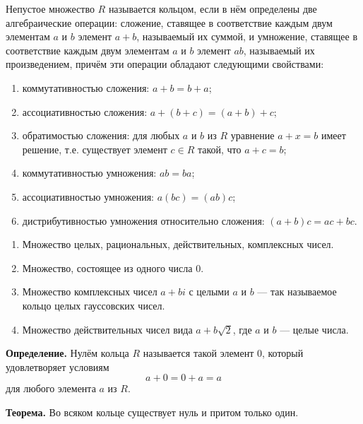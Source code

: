 \begin{rusblock}
Непустое множество $R$ называется кольцом, если в нём определены две алгебраические операции: сложение, ставящее в соответствие каждым двум элементам $a$ и $b$ элемент $a+b$, называемый их суммой, и умножение, ставящее в соответствие каждым двум элементам $a$ и $b$ элемент $ab$, называемый их произведением, причём эти операции обладают следующими свойствами:
\begin{enumerate}[leftmargin=2.2em]
\item коммутативностью сложения: $a+b=b+a$;
\item ассоциативностью сложения: $a+(b+c)=(a+b)+c$;
\item обратимостью сложения: для любых $a$ и $b$ из $R$ уравнение $a+x=b$ имеет решение, т.е. существует элемент $c\in R$ такой, что $a+c=b$;
\item коммутативностью умножения: $ab=ba$;
\item ассоциативностью умножения: $a(bc)=(ab)c$;
\item дистрибутивностью умножения относительно сложения: $(a+b)c=ac+bc$.
\end{enumerate}
\end{rusblock}

\begin{rusblock}
\begin{enumerate}[leftmargin=2.2em]
\item Множество целых, рациональных, действительных, комплексных чисел.
\item Множество, состоящее из одного числа $0$.
\item Множество комплексных чисел $a+bi$ с целыми $a$ и $b$ --- так называемое кольцо целых гауссовских чисел.
\item Множество действительных чисел вида $a+b\sqrt2$, где $a$ и $b$ --- целые числа.
\end{enumerate}
\end{rusblock}

\begin{rusblock}
\textbf{Определение.} Нулём кольца $R$ называется такой элемент $0$, который удовлетворяет условиям
\[
a+0=0+a=a
\]
для любого элемента $a$ из $R$.

\textbf{Теорема.} Во всяком кольце существует нуль и притом только один.
\end{rusblock}

